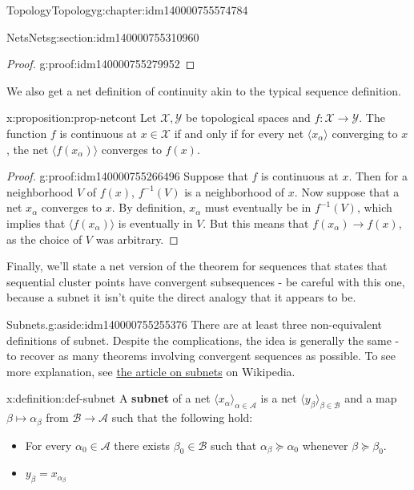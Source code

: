 \documentclass[oneside,10pt,]{book}
\newcommand{\terminology}[1]{\textbf{#1}}
\numberwithin{equation}{section}
\newcommand{\inv}{^{-1}}
\newcommand\net[1]{\langle #1 \rangle}
\numberwithin{equation}{section}
\begin{document}
\begin{chapterptx}{Topology}{}{Topology}{}{}{g:chapter:idm140000755574784}
\begin{sectionptx}{Nets}{}{Nets}{}{}{g:section:idm140000755310960}
\begin{proof}{}{g:proof:idm140000755279952}
\end{proof}
We also get a net definition of continuity akin to the typical sequence definition.%
\begin{proposition}{}{}{x:proposition:prop-netcont}%
Let \(\mathcal X, \mathcal Y\) be topological spaces and \(f: \mathcal X \to \mathcal Y\). The function \(f\) is continuous at \(x \in \mathcal X\) if and only if for every net \(\net{x_\alpha}\) converging to \(x\), the net \(\net{f(x_\alpha)}\) converges to \(f(x)\).%
\end{proposition}
\begin{proof}{}{g:proof:idm140000755266496}
Suppose that \(f\) is continuous at \(x\). Then for a neighborhood \(V\) of \(f(x)\), \(f\inv(V)\) is a neighborhood of \(x\). Now suppose that a net \(x_\alpha\) converges to \(x\). By definition, \(x_\alpha\) must eventually be in \(f\inv(V)\), which implies that \(\net{f(x_\alpha)}\) is eventually in \(V\). But this means that \(f(x_\alpha) \to f(x)\), as the choice of \(V\) was arbitrary.%
\end{proof}
Finally, we'll state a net version of the theorem for sequences that states that sequential cluster points have convergent subsequences - be careful with this one, because a subnet it isn't quite the direct analogy that it appears to be.%
\begin{aside}{Subnets.}{g:aside:idm140000755255376}%
There are at least three non-equivalent definitions of subnet. Despite the complications, the idea is generally the same - to recover as many theorems involving convergent sequences as possible. To see more explanation, see \href{https://en.wikipedia.org/wiki/Subnet_(mathematics)}{the article on subnets}\footnotemark{} on Wikipedia.%
\end{aside}
%
\begin{definition}{}{x:definition:def-subnet}%
A \terminology{subnet} of a net \(\net{x_\alpha}_{\alpha \in \mathcal A}\) is a net \(\net{y_\beta}_{\beta \in \mathcal B}\) and a map \(\beta \mapsto \alpha_\beta\) from \(\mathcal B \to \mathcal A\) such that the following hold:%
\begin{itemize}[label=\textbullet]
\item{}For every \(\alpha_0 \in \mathcal A\) there exists \(\beta_0 \in \mathcal B\) such that \(\alpha_\beta \succeq \alpha_0\) whenever \(\beta \succeq \beta_0\).%
\item{}\(\displaystyle y_\beta = x_{\alpha_\beta}\)%

\end{itemize}
\end{definition}
\end{sectionptx}
\end{chapterptx}
\end{document}
